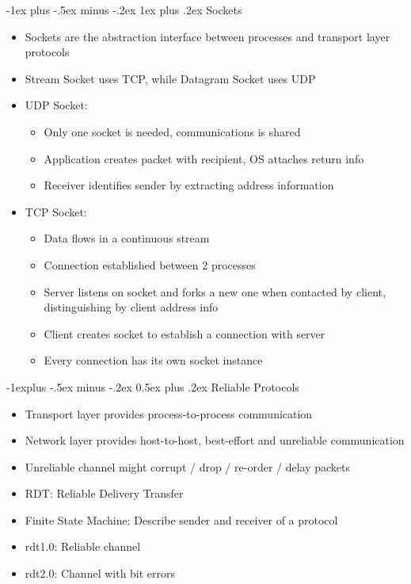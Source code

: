 \documentclass[10pt, landscape]{article}
\makeatletter
\renewcommand{\section}{\@startsection{section}{1}{0mm}%
                                {-1ex plus -.5ex minus -.2ex}%
                                {0.5ex plus .2ex}%
                                {\normalfont\large\bfseries}}
\renewcommand{\section}{\@startsection{section}{2}{0mm}%
                                {-1explus -.5ex minus -.2ex}%
                                {0.5ex plus .2ex}%
                                {\normalfont\normalsize\bfseries}}
\renewcommand{\subsection}{\@startsection{subsection}{3}{0mm}%
                                {-1ex plus -.5ex minus -.2ex}%
                                {1ex plus .2ex}%
                                {\normalfont\small\bfseries}}%
\makeatother
\begin{document}
\begin{multicols*}{3}
\subsection{Sockets}
\begin{itemize}
    \item Sockets are the abstraction interface between processes and transport layer protocols
    \item Stream Socket uses TCP, while Datagram Socket uses UDP
    \item UDP Socket:
    \begin{itemize}
        \item Only one socket is needed, communications is shared
        \item Application creates packet with recipient, OS attaches return info
        \item Receiver identifies sender by extracting address information
    \end{itemize}
    \item TCP Socket:
    \begin{itemize}
        \item Data flows in a continuous stream
        \item Connection established between 2 processes
        \item Server listens on socket and forks a new one when contacted by client, distinguishing by client address info
        \item Client creates socket to establish a connection with server
        \item Every connection has its own socket instance
    \end{itemize}
\end{itemize}

\section{Reliable Protocols}
\begin{itemize}
    \item Transport layer provides process-to-process communication
    \item Network layer provides host-to-host, best-effort and unreliable communication
    \item Unreliable channel might corrupt / drop / re-order / delay packets
    \item RDT: Reliable Delivery Transfer
    \item Finite State Machine: Describe sender and receiver of a protocol
    \item rdt1.0: Reliable channel
    \item rdt2.0: Channel with bit errors
    

\end{itemize}
\end{multicols*}
\end{document}

